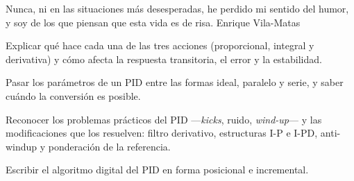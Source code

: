 
  {Nunca, ni en las situaciones más desesperadas, he perdido mi sentido del humor, y soy de los que piensan que esta vida es de risa.}
  {Enrique Vila-Matas}

\begin{objetivos}
  \item Explicar qué hace cada una de las tres acciones (proporcional, integral y derivativa) y cómo afecta la respuesta transitoria, el error y la estabilidad.
  \item Pasar los parámetros de un PID entre las formas ideal, paralelo y serie, y saber cuándo la conversión es posible.
  \item Reconocer los problemas prácticos del PID ---\emph{kicks}, ruido, \emph{wind-up}--- y las modificaciones que los resuelven: filtro derivativo, estructuras I-P e I-PD, anti-windup y ponderación de la referencia.
  \item Escribir el algoritmo digital del PID en forma posicional e incremental.
\end{objetivos}









